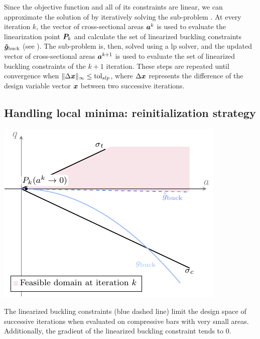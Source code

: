 Since the objective function and all of its constraints are linear, we can approximate the solution of  by iteratively solving the sub-problem . At every iteration $k$, the vector of cross-sectional areas $\bm{a}^k$ is used to evaluate the linearization point $\bm{P}_{k}$ and calculate the set of linearized buckling constraints $\bm{\tilde{g}}_{\textrm{buck}}$ (see ). The sub-problem  is, then, solved using a \gls{lp} solver, and the updated vector of cross-sectional areas $\bm{a}^{k+1}$ is used to evaluate the set of linearized buckling constraints of the $k+1$ iteration. These steps are repeated until convergence \ie when $\lVert\Delta \bm{x}\rVert_\infty\leq \text{tol}_{slp}$, where $\Delta \bm{x}$ represents the difference of the design variable vector $\bm{x}$ between two successive iterations.

\subsection{Handling local minima: reinitialization strategy}
\label{sec:04_reinit}

\begin{marginfigure}
    \centering
    \includegraphics[width=\linewidth]{figures/04_TTO_improvements/04_SLP_tiny_area_design_space/slp_tiny_design_space.pdf}
    \caption{The linearized buckling constraints (blue dashed line) limit the design space of successive iterations when evaluated on compressive bars with very small areas. Additionally, the gradient of the linearized buckling constraint tends to 0.}
    \label{fig:04_tiny-area}
\end{marginfigure}

